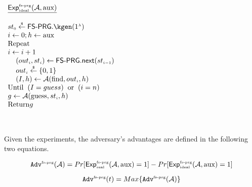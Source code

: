    \begin{minipage}{57mm}
\begin{tcolorbox}[left=0mm]
$
  \begin{array}{l}
 \underline{\mathsf{Exp}_{\sss \text{ideal}}^{\sss \text{fs-prg}}(\mathcal{A}, \text{aux})}\\
  \\
   {st}_{\sss 0}\stackrel{\sss \$}\leftarrow \mathsf{FS\text{-}PRG}.\kgen (1^{\sss \lambda}) \\
%
i\gets 0; h\gets \text{aux} \\
\text {Repeat}\\
i\gets i+1\\
\hspace{4mm} ({out}_{\sss i}, st_{\sss i})\leftarrow  \mathsf{FS\text{-}PRG.next}   (st_{\sss i-1})\\
\hspace{4mm}{out}_{\sss i}\stackrel{\sss \$}\leftarrow\{0, 1\}\\
\hspace{4mm}  (I,h)\gets\mathcal{A}(\text{find}, out_{\sss i}, h)\\
\text{Until}\hspace{2mm}  (I=guess)\hspace{2mm}  \text{or}\hspace{2mm}  (i=n)\\
g\gets\mathcal{A}(\text{guess}, st_{\sss i}, h)\\
\text{Return} g\\
  \end{array}%
$
\end{tcolorbox}
   \end{minipage}
   
\



Given the experiments, the adversary's advantages are defined in the following two equations. 


\begin{equation}\label{equ::adv-1st-term}
\mathtt{Adv}^{\scriptscriptstyle \text{fs-prg}}(\mathcal{A})=Pr[\mathsf{Exp}_{\scriptscriptstyle \text{real}}^{\scriptscriptstyle \text{fs-prg}}(\mathcal{A},\text{aux})=1]-Pr[\mathsf{Exp}_{\scriptscriptstyle \text{ideal}}^{\scriptscriptstyle \text{fs-prg}}(\mathcal{A},\text{aux})=1]
\end{equation}


\begin{equation}\label{equ::adv-2nd-term}
\mathtt{Adv}^{\scriptscriptstyle \text{fs-prg}}(t)= Max\{\mathtt{Adv}^{\scriptscriptstyle \text{fs-prg}}(\mathcal{A})\}
\end{equation}


